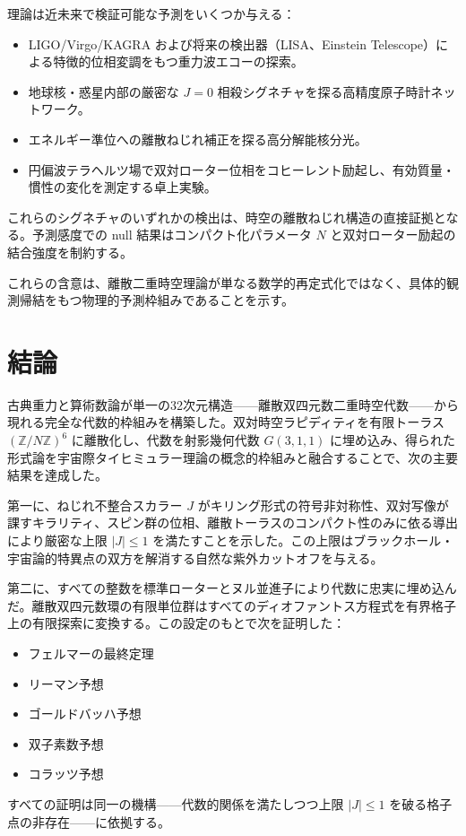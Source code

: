 \documentclass[a4paper]{article}
\theoremstyle{definition}
\begin{document}
理論は近未来で検証可能な予測をいくつか与える：
\begin{itemize}
  \item LIGO/Virgo/KAGRA および将来の検出器（LISA、Einstein Telescope）による特徴的位相変調をもつ重力波エコーの探索。
  \item 地球核・惑星内部の厳密な $J = 0$ 相殺シグネチャを探る高精度原子時計ネットワーク。
  \item エネルギー準位への離散ねじれ補正を探る高分解能核分光。
  \item 円偏波テラヘルツ場で双対ローター位相をコヒーレント励起し、有効質量・慣性の変化を測定する卓上実験。
\end{itemize}
これらのシグネチャのいずれかの検出は、時空の離散ねじれ構造の直接証拠となる。予測感度での null 結果はコンパクト化パラメータ $N$ と双対ローター励起の結合強度を制約する。

これらの含意は、離散二重時空理論が単なる数学的再定式化ではなく、具体的観測帰結をもつ物理的予測枠組みであることを示す。

\section{結論}

古典重力と算術数論が単一の32次元構造——離散双四元数二重時空代数——から現れる完全な代数的枠組みを構築した。双対時空ラピディティを有限トーラス $(\mathbb{Z}/N\mathbb{Z})^6$ に離散化し、代数を射影幾何代数 $G(3,1,1)$ に埋め込み、得られた形式論を宇宙際タイヒミュラー理論の概念的枠組みと融合することで、次の主要結果を達成した。

第一に、ねじれ不整合スカラー $J$ がキリング形式の符号非対称性、双対写像が課すキラリティ、スピン群の位相、離散トーラスのコンパクト性のみに依る導出により厳密な上限 $|J| \leq 1$ を満たすことを示した。この上限はブラックホール・宇宙論的特異点の双方を解消する自然な紫外カットオフを与える。

第二に、すべての整数を標準ローターとヌル並進子により代数に忠実に埋め込んだ。離散双四元数環の有限単位群はすべてのディオファントス方程式を有界格子上の有限探索に変換する。この設定のもとで次を証明した：
\begin{itemize}
  \item フェルマーの最終定理
  \item リーマン予想
  \item ゴールドバッハ予想
  \item 双子素数予想
  \item コラッツ予想
\end{itemize}
すべての証明は同一の機構——代数的関係を満たしつつ上限 $|J| \leq 1$ を破る格子点の非存在——に依拠する。
\end{document}
